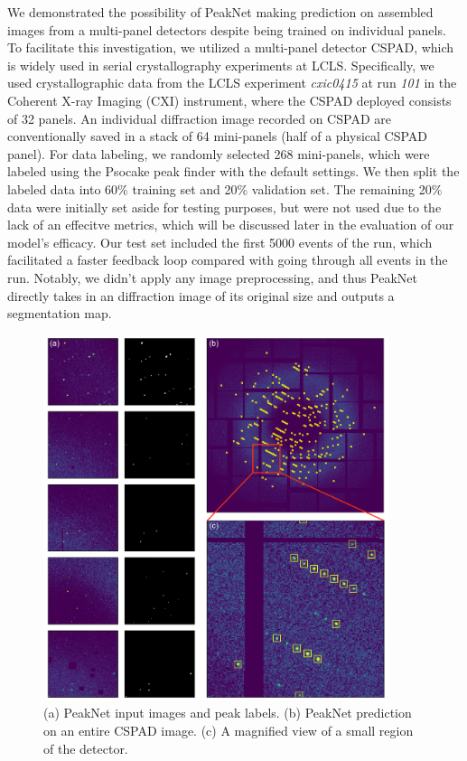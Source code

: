 \documentclass[conference]{IEEEtran}
\newcommand{\peaknet}{PeakNet}
\newcommand{\psocake}{Psocake}
\begin{document}
We demonstrated the possibility of \peaknet{} making prediction on assembled
images from a multi-panel detectors despite being trained on individual panels.
To facilitate this investigation, we utilized a multi-panel detector CSPAD,
which is widely used in serial crystallography experiments at LCLS.
Specifically, we used crystallographic data from the LCLS experiment
\textit{cxic0415} at run \textit{101} in the Coherent X-ray Imaging (CXI)
instrument, where the CSPAD deployed consists of 32 panels.  An individual
diffraction image recorded on CSPAD are conventionally saved in a stack of 64
mini-panels (half of a physical CSPAD panel).  For data labeling, we randomly
selected 268 mini-panels, which were labeled using the \psocake{} peak finder
with the default settings.  We then split the labeled data into 60\% training
set and 20\% validation set.  The remaining 20\% data were initially set aside
for testing purposes, but were not used due to the lack of an effecitve metrics,
which will be discussed later in the evaluation of our model's efficacy.  Our
test set included the first 5000 events of the run, which facilitated a faster
feedback loop compared with going through all events in the run.  Notably, we
didn't apply any image preprocessing, and thus \peaknet{} directly takes in an
diffraction image of its original size and outputs a segmentation map.

\begin{figure}[htbp]
\centering
\includegraphics[width=0.9\textwidth,keepaspectratio]
{./figures/label_to_predict_with_zoom.pdf}
\caption{(a) \peaknet{} input images and peak labels.  (b) \peaknet{} prediction
on an entire CSPAD image.  (c) A magnified view of a small region of the
detector.}
\label{fig : label and predict}
\end{figure}
\end{document}
